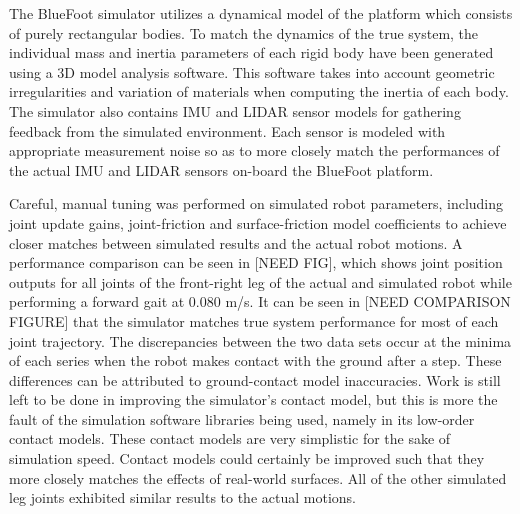 		The BlueFoot simulator utilizes a dynamical model of the platform which consists of purely rectangular bodies. To match the dynamics of the true system, the individual mass and inertia parameters of each rigid body have been generated using a 3D model analysis software. This software takes into account geometric irregularities and variation of materials when computing the inertia of each body. The simulator also contains IMU and LIDAR sensor models for gathering feedback from the simulated environment. Each sensor is modeled with appropriate measurement noise so as to more closely match the performances of the actual IMU and LIDAR sensors on-board the BlueFoot platform.

		Careful, manual tuning was performed on simulated robot parameters, including joint update gains, joint-friction and surface-friction model coefficients to achieve closer matches between simulated results and the actual robot motions. A performance comparison can be seen in [NEED FIG], which shows joint position outputs for all joints of the front-right leg of the actual and simulated robot while performing a forward gait at $0.080$ m/s. It can be seen in [NEED COMPARISON FIGURE] that the simulator matches true system performance for most of each joint trajectory. The discrepancies between the two data sets occur at the minima of each series when the robot makes contact with the ground after a step. These differences can be attributed to ground-contact model inaccuracies. Work is still left to be done in improving the simulator's contact model, but this is more the fault of the simulation software libraries being used, namely in its low-order contact models. These contact models are very simplistic for the sake of simulation speed. Contact models could certainly be improved such that they more closely matches the effects of real-world surfaces. All of the other simulated leg joints exhibited similar results to the actual motions.


